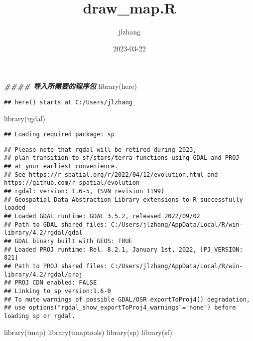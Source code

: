 \documentclass[
]{article}
\title{draw\_map.R}
\author{jlzhang}
\date{2023-03-22}
\newenvironment{Shaded}{\begin{snugshade}}{\end{snugshade}}
\newcommand{\DocumentationTok}[1]{\textcolor[rgb]{0.56,0.35,0.01}{\textbf{\textit{#1}}}}
\newcommand{\FunctionTok}[1]{\textcolor[rgb]{0.00,0.00,0.00}{#1}}
\newcommand{\NormalTok}[1]{#1}
\begin{document}
\maketitle

\begin{Shaded}
\begin{Highlighting}[]
\DocumentationTok{\#\#\#\# 导入所需要的程序包}
\FunctionTok{library}\NormalTok{(here)}
\end{Highlighting}
\end{Shaded}

\begin{verbatim}
## here() starts at C:/Users/jlzhang
\end{verbatim}

\begin{Shaded}
\begin{Highlighting}[]
\FunctionTok{library}\NormalTok{(rgdal)}
\end{Highlighting}
\end{Shaded}

\begin{verbatim}
## Loading required package: sp
\end{verbatim}

\begin{verbatim}
## Please note that rgdal will be retired during 2023,
## plan transition to sf/stars/terra functions using GDAL and PROJ
## at your earliest convenience.
## See https://r-spatial.org/r/2022/04/12/evolution.html and https://github.com/r-spatial/evolution
## rgdal: version: 1.6-5, (SVN revision 1199)
## Geospatial Data Abstraction Library extensions to R successfully loaded
## Loaded GDAL runtime: GDAL 3.5.2, released 2022/09/02
## Path to GDAL shared files: C:/Users/jlzhang/AppData/Local/R/win-library/4.2/rgdal/gdal
## GDAL binary built with GEOS: TRUE 
## Loaded PROJ runtime: Rel. 8.2.1, January 1st, 2022, [PJ_VERSION: 821]
## Path to PROJ shared files: C:/Users/jlzhang/AppData/Local/R/win-library/4.2/rgdal/proj
## PROJ CDN enabled: FALSE
## Linking to sp version:1.6-0
## To mute warnings of possible GDAL/OSR exportToProj4() degradation,
## use options("rgdal_show_exportToProj4_warnings"="none") before loading sp or rgdal.
\end{verbatim}

\begin{Shaded}
\begin{Highlighting}[]
\FunctionTok{library}\NormalTok{(tmap)}
\FunctionTok{library}\NormalTok{(tmaptools)}
\FunctionTok{library}\NormalTok{(sp)}
\FunctionTok{library}\NormalTok{(sf)}
\end{Highlighting}
\end{Shaded}
\end{document}
